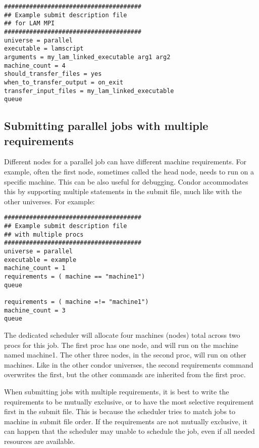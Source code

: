 \begin{verbatim}
######################################
## Example submit description file
## for LAM MPI
######################################
universe = parallel
executable = lamscript
arguments = my_lam_linked_executable arg1 arg2
machine_count = 4
should_transfer_files = yes
when_to_transfer_output = on_exit
transfer_input_files = my_lam_linked_executable
queue
\end{verbatim}

\subsection{\label{sec:parallel-multi-proc}Submitting parallel jobs with multiple requirements}
Different nodes for a parallel job can have different machine
requirements.  For example, often the first node, sometimes called the
head node, needs to run on a specific machine.  This can be also
useful for debugging.  Condor accommodates this by supporting multiple
 statements in the submit file, much like with the other
universes.  For example:

\begin{verbatim}
######################################
## Example submit description file
## with multiple procs
######################################
universe = parallel
executable = example
machine_count = 1
requirements = ( machine == "machine1")
queue

requirements = ( machine =!= "machine1")
machine_count = 3
queue
\end{verbatim}

The dedicated scheduler will allocate four machines (nodes) total across
two procs for this job.  The first proc has one node,
 and will run on the machine named machine1.  The 
other three nodes, in the second proc, will run on other machines.  
Like in the other condor universes, the second requirements command 
overwrites the first, but the other commands are inherited from the 
first proc.

When submitting jobs with multiple requirements, it is
best to write the requirements to be mutually exclusive,
or to have the most selective requirement first in the submit file.
This is because the scheduler tries to match jobs to machine in
submit file order.  If the requirements are not mutually exclusive,
it can happen that the scheduler may unable to schedule the job, even
if all needed resources are available.

